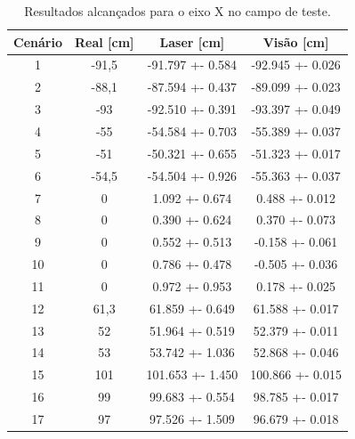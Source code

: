 \documentclass[acronym, symbols, table]{fei}
\begin{document}
				\begin{table}[!htb]
					\centering
					\caption{Resultados alcançados para o eixo X no campo de teste.}
					\label{tbl:general_results_x}
					\begin{tabular}{|c|
							>{\columncolor[HTML]{FBE2D5}}c |
							>{\columncolor[HTML]{FBE2D5}}c |
							>{\columncolor[HTML]{FBE2D5}}c |}
						\hline
						Cenário                    & Real {[}cm{]}   & Laser {[}cm{]}   & Visão {[}cm{]}   \\ \hline
						\cellcolor[HTML]{FFFFFF}1  & -91,5           & -91.797 +- 0.584 & -92.945 +- 0.026 \\ \hline
						\cellcolor[HTML]{FFFFFF}2  & -88,1           & -87.594 +- 0.437 & -89.099 +- 0.023 \\ \hline
						\cellcolor[HTML]{FFFFFF}3  & -93             & -92.510 +- 0.391 & -93.397 +- 0.049 \\ \hline
						\cellcolor[HTML]{FFFFFF}4  & -55             & -54.584 +- 0.703 & -55.389 +- 0.037 \\ \hline
						\cellcolor[HTML]{FFFFFF}5  & -51             & -50.321 +- 0.655 & -51.323 +- 0.017 \\ \hline
						\cellcolor[HTML]{FFFFFF}6  & -54,5           & -54.504 +- 0.926 & -55.363 +- 0.037 \\ \hline
						\cellcolor[HTML]{FFFFFF}7  & 0               & 1.092 +- 0.674   & 0.488 +- 0.012   \\ \hline
						\cellcolor[HTML]{FFFFFF}8  & 0               & 0.390 +- 0.624   & 0.370 +- 0.073   \\ \hline
						\cellcolor[HTML]{FFFFFF}9  & 0               & 0.552 +- 0.513   & -0.158 +- 0.061  \\ \hline
						\cellcolor[HTML]{FFFFFF}10 & 0               & 0.786 +- 0.478   & -0.505 +- 0.036  \\ \hline
						\cellcolor[HTML]{FFFFFF}11 & 0               & 0.972 +- 0.953   & 0.178 +- 0.025   \\ \hline
						\cellcolor[HTML]{FFFFFF}12 & 61,3            & 61.859 +- 0.649  & 61.588 +- 0.017  \\ \hline
						\cellcolor[HTML]{FFFFFF}13 & 52              & 51.964 +- 0.519  & 52.379 +- 0.011  \\ \hline
						\cellcolor[HTML]{FFFFFF}14 & 53              & 53.742 +- 1.036  & 52.868 +- 0.046  \\ \hline
						\cellcolor[HTML]{FFFFFF}15 & 101             & 101.653 +- 1.450 & 100.866 +- 0.015 \\ \hline
						\cellcolor[HTML]{FFFFFF}16 & 99              & 99.683 +- 0.554  & 98.785 +- 0.017  \\ \hline
						\cellcolor[HTML]{FFFFFF}17 & 97              & 97.526 +- 1.509  & 96.679 +- 0.018  \\ \hline
					\end{tabular}
				\end{table}
			
\end{document}
